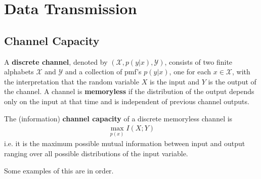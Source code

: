 \section{Data Transmission}
\subsection{Channel Capacity}
\begin{definition}
	A \textbf{discrete channel}, denoted by $(\mathcal{X},p(y|x),\mathcal{Y})$, consists of two finite alphabets $\mathcal{X}$ and $\mathcal{Y}$ and a collection of pmf's $p(y|x)$, one for each $x \in \mathcal{X}$, with the interpretation that the random variable $X$ is the input and $Y$ is the output of the channel. A channel is \textbf{memoryless} if the distribution of the output depends only on the input at that time and is independent of previous channel outputs. 
\end{definition}
\begin{definition}
	The (information) \textbf{channel capacity} of a discrete memoryless channel is 
	\begin{align}
		\max_{p(x)} I(X;Y)
	\end{align}
i.e. it is the maximum possible mutual information between input and output ranging over all possible distributions of the input variable. 
\end{definition}
Some examples of this are in order. 

